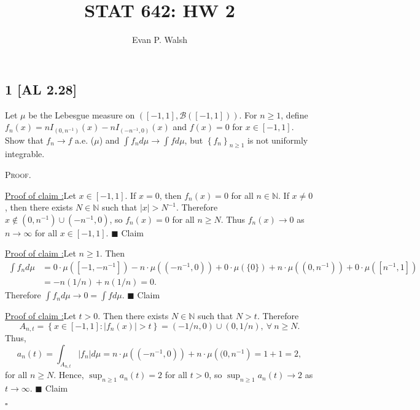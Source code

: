\documentclass[12pt]{article}
\title{STAT 642: HW 2}
\author{Evan P. Walsh}
\newcounter{ProofCounter}
\newcounter{ClaimCounter}[ProofCounter]
\newenvironment{Proof}{\stepcounter{ProofCounter}\textsc{Proof.}}{\hfill$\square$}
\newenvironment{claim}[1]{\vspace{1mm}\stepcounter{ClaimCounter}\par\noindent\underline{\bf Claim \theClaimCounter:}\space#1}{}
\newenvironment{claimproof}[1]{\par\noindent\underline{Proof of claim \theClaimCounter:}\space#1}{\hfill $\blacksquare$ Claim \theClaimCounter}
\begin{document}
\maketitle


\subsection*{1 [AL 2.28]}
\begin{tcolorbox}
Let $\mu$ be the Lebesgue measure on $\left( [-1,1], \mathcal{B}([-1,1]) \right)$. For $n \geq 1$, define $f_{n}(x) = nI_{(0,n^{-1})}(x) -
nI_{(-n^{-1},0)}(x)$ and $f(x) = 0$ for $x \in [-1,1]$. Show that $f_{n} \rightarrow f$ a.e. ($\mu$) and $\int f_{n}d\mu \rightarrow \int fd\mu$, but
$\left\{ f_{n} \right\}_{n\geq 1}$ is not uniformly integrable.
\end{tcolorbox}

\begin{Proof}
$\ $

\begin{claimproof}
Let $x \in [-1,1]$. If $x = 0$, then $f_{n}(x) = 0$ for all $n \in \mathbb{N}$. If $x \neq 0$, then there exists $N \in \mathbb{N}$ such that $|x| >
N^{-1}$. Therefore $x \notin (0,n^{-1}) \cup (-n^{-1},0)$, so $f_{n}(x) = 0$ for all $n \geq N$. Thus $f_{n}(x) \rightarrow 0$ as $n \rightarrow
\infty$ for all $x \in [-1,1]$.
\end{claimproof}

\begin{claimproof}
Let $n \geq 1$. Then 
\begin{align*}
\int f_{n}d\mu & = 0\cdot \mu\left( [-1,-n^{-1}] \right) -n\cdot \mu\left( (-n^{-1},0) \right) + 0\cdot \mu\left( \{0\} \right) + 
n\cdot \mu\left( (0,n^{-1}) \right) + 0\cdot \mu\left( [n^{-1},1] \right) \\
& = -n(1/n) + n(1/n) = 0.
\end{align*}
Therefore $\int f_{n}d\mu \rightarrow 0 = \int fd\mu$.
\end{claimproof}

\begin{claimproof}
Let $t > 0$. Then there exists $N \in \mathbb{N}$ such that $N > t$. Therefore 
\[ A_{n,t} = \left\{ x \in [-1,1] : |f_{n}(x)| > t \right\} = (-1/n, 0) \cup (0, 1/n), \ \forall \ n \geq N. \]
Thus,
\[ a_{n}(t) = \int_{A_{n,t}} |f_{n}|d\mu = n\cdot \mu\left( (-n^{-1},0) \right) + n\cdot \mu\left( (0,n^{-1} \right) = 1 + 1 = 2, \]
for all $n \geq N$. Hence, $\sup_{n\geq 1}a_{n}(t) = 2$ for all $t > 0$, so $\sup_{n\geq 1}a_{n}(t) \rightarrow 2$ as $t\rightarrow \infty$.
\end{claimproof}

\end{Proof}
\end{document}
